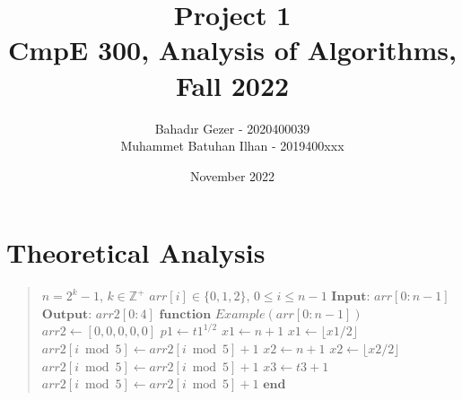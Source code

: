 \documentclass[10pt]{article}
\title{\vspace{-1cm} \Huge Project 1 \\ \LARGE CmpE 300, Analysis of Algorithms, Fall 2022 }
\author{
    Bahadır Gezer - 2020400039 \\
    Muhammet Batuhan Ilhan - 2019400xxx \\
}
\date{November 2022}
\begin{document}
\maketitle
  
\tableofcontents

\newpage
\section{Theoretical Analysis}

\begin{quote}
\begin{algorithmic}[1]
\Require $n = 2^{k}-1$, $k \in \mathbb{Z}^{+}$
\Require $arr[i] \in \{0,1,2\}$, $0 \leq i \leq n-1$
\State $\textbf{Input: } arr[0:n-1]$ 
\State $\textbf{Output: } arr2[0:4]$ 
\State $\textbf{function }Example(arr[0:n-1])$
\State 
\State $arr2 \gets [0,0,0,0,0]$
            \State $p1 \gets t1^{1/2}$
            \State $x1 \gets n + 1$
                \State $x1 \gets \lfloor x1 / 2 \rfloor$
                \State $arr2[i \bmod 5] \gets arr2[i \bmod 5] + 1$
            \EndWhile
        \EndFor
                \State $x2 \gets n + 1$
                    \State $x2 \gets \lfloor x2 / 2 \rfloor$
                    \State $arr2[i \bmod 5] \gets arr2[i \bmod 5] + 1$
                \EndWhile
            \EndFor
        \EndFor
            \State $x3 \gets t3 + 1$
                \State $arr2[i \bmod 5] \gets arr2[i \bmod 5] + 1$
            \EndFor
        \EndFor
    \EndIf
\EndFor
\State $\textbf{end}$
\end{algorithmic}
\end{quote}
\end{document}
